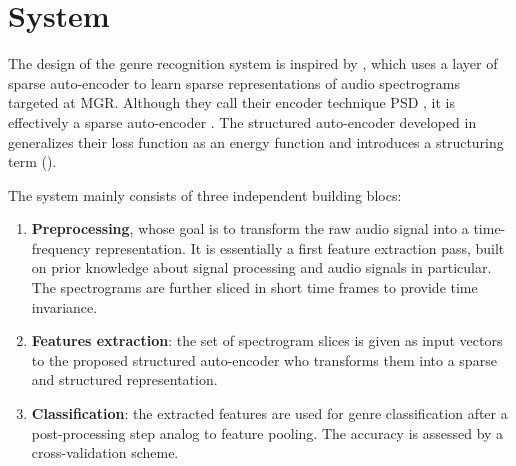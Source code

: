





\chapter{System} \label{chap:system}

The design of the genre recognition system is inspired by \cite{lecun2011PSDaudio}, which uses a layer of sparse auto-encoder to learn sparse representations of audio spectrograms targeted at \gls{MGR}. Although they call their encoder technique \gls{PSD} \cite{lecun2010PSD}, it is effectively a sparse auto-encoder \cite{bengio2009learningDeepAI}. The structured auto-encoder developed in  generalizes their loss function as an energy function and introduces a structuring term ().

The system mainly consists of three independent building blocs:
\begin{enumerate}
	\item \textbf{Preprocessing}, whose goal is to transform the raw audio signal into a time-frequency representation. It is essentially a first feature extraction pass, built on prior knowledge about signal processing and audio signals in particular. The spectrograms are further sliced in short time frames to provide time invariance.
	\item \textbf{Features extraction}: the set of spectrogram slices is given as input vectors to the proposed structured auto-encoder who transforms them into a sparse and structured representation.
	\item \textbf{Classification}: the extracted features are used for genre classification after a post-processing step analog to feature pooling. The accuracy is assessed by a cross-validation scheme.
\end{enumerate}

